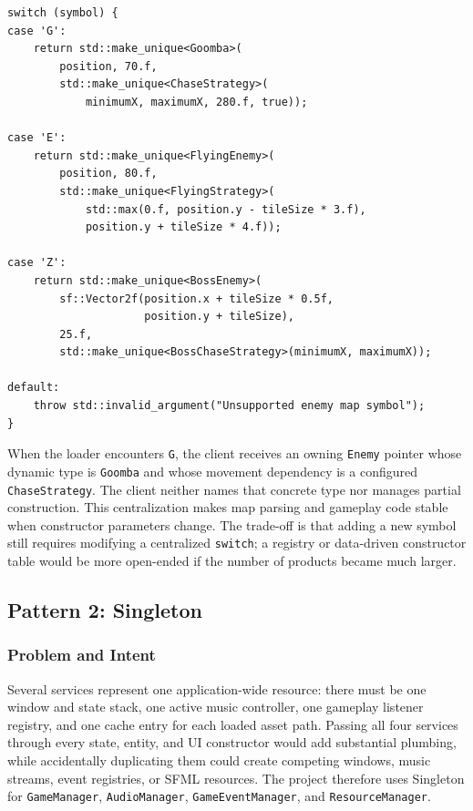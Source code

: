 \documentclass{template}
\begin{document}
\begin{lstlisting}[style=gamecode,basicstyle=\ttfamily\scriptsize,caption={Abridged enemy factory selection and strategy injection.}]
switch (symbol) {
case 'G':
    return std::make_unique<Goomba>(
        position, 70.f,
        std::make_unique<ChaseStrategy>(
            minimumX, maximumX, 280.f, true));

case 'E':
    return std::make_unique<FlyingEnemy>(
        position, 80.f,
        std::make_unique<FlyingStrategy>(
            std::max(0.f, position.y - tileSize * 3.f),
            position.y + tileSize * 4.f));

case 'Z':
    return std::make_unique<BossEnemy>(
        sf::Vector2f(position.x + tileSize * 0.5f,
                     position.y + tileSize),
        25.f,
        std::make_unique<BossChaseStrategy>(minimumX, maximumX));

default:
    throw std::invalid_argument("Unsupported enemy map symbol");
}
\end{lstlisting}

When the loader encounters \texttt{G}, the client receives an owning
\texttt{Enemy} pointer whose dynamic type is \texttt{Goomba} and whose movement
dependency is a configured \texttt{ChaseStrategy}. The client neither names
that concrete type nor manages partial construction. This centralization makes
map parsing and gameplay code stable when constructor parameters change. The
trade-off is that adding a new symbol still requires modifying a centralized
\texttt{switch}; a registry or data-driven constructor table would be more
open-ended if the number of products became much larger.

\subsection{Pattern 2: Singleton}

\subsubsection{Problem and Intent}

Several services represent one application-wide resource: there must be one
window and state stack, one active music controller, one gameplay listener
registry, and one cache entry for each loaded asset path. Passing all four
services through every state, entity, and UI constructor would add substantial
plumbing, while accidentally duplicating them could create competing windows,
music streams, event registries, or SFML resources. The project therefore uses
Singleton for \texttt{GameManager}, \texttt{AudioManager},
\texttt{GameEventManager}, and \texttt{ResourceManager}.
\end{document}
